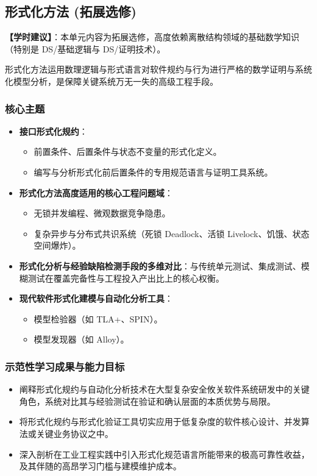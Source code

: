 \subsection{形式化方法 (拓展选修)}
\textbf{【学时建议】}：本单元内容为拓展选修，高度依赖离散结构领域的基础数学知识（特别是 DS/基础逻辑与 DS/证明技术）。

形式化方法运用数理逻辑与形式语言对软件规约与行为进行严格的数学证明与系统化模型分析，是保障关键系统万无一失的高级工程手段。

\subsubsection{核心主题}
\begin{itemize}
    \item \textbf{接口形式化规约}：
    \begin{itemize}
        \item 前置条件、后置条件与状态不变量的形式化定义。
        \item 编写与分析形式化前后置条件的专用规范语言与证明工具系统。
    \end{itemize}
    \item \textbf{形式化方法高度适用的核心工程问题域}：
    \begin{itemize}
        \item 无锁并发编程、微观数据竞争隐患。
        \item 复杂异步与分布式共识系统（死锁 Deadlock、活锁 Livelock、饥饿、状态空间爆炸）。
    \end{itemize}
    \item \textbf{形式化分析与经验缺陷检测手段的多维对比}：与传统单元测试、集成测试、模糊测试在覆盖完备性与工程投入产出比上的核心权衡。
    \item \textbf{现代软件形式化建模与自动化分析工具}：
    \begin{itemize}
        \item 模型检验器（如 TLA+、SPIN）。
        \item 模型发现器（如 Alloy）。
    \end{itemize}
\end{itemize}

\subsubsection{示范性学习成果与能力目标}
\begin{itemize}
    \item 阐释形式化规约与自动化分析技术在大型复杂安全攸关软件系统研发中的关键角色，系统对比其与经验测试在验证和确认层面的本质优势与局限。
    \item 将形式化规约与形式化验证工具切实应用于低复杂度的软件核心设计、并发算法或关键业务协议之中。
    \item 深入剖析在工业工程实践中引入形式化规范语言所能带来的极高可靠性收益，及其伴随的高昂学习门槛与建模维护成本。
\end{itemize}

